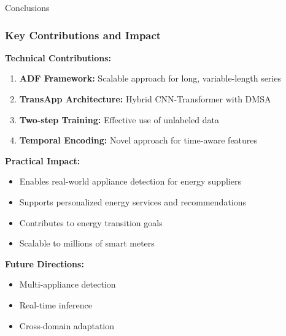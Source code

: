 \documentclass{beamer}
\begin{document}
\begin{frame}{Conclusions}
\frametitle{Key Contributions and Impact}

\textbf{Technical Contributions:}
\begin{enumerate}
    \item \textbf{ADF Framework:} Scalable approach for long, variable-length series
    \item \textbf{TransApp Architecture:} Hybrid CNN-Transformer with DMSA
    \item \textbf{Two-step Training:} Effective use of unlabeled data
    \item \textbf{Temporal Encoding:} Novel approach for time-aware features
\end{enumerate}

\vspace{0.3cm}

\textbf{Practical Impact:}
\begin{itemize}
    \item Enables real-world appliance detection for energy suppliers
    \item Supports personalized energy services and recommendations
    \item Contributes to energy transition goals
    \item Scalable to millions of smart meters
\end{itemize}

\vspace{0.3cm}

\textbf{Future Directions:}
\begin{itemize}
    \item Multi-appliance detection
    \item Real-time inference
    \item Cross-domain adaptation
\end{itemize}

\end{frame}
\end{document}
